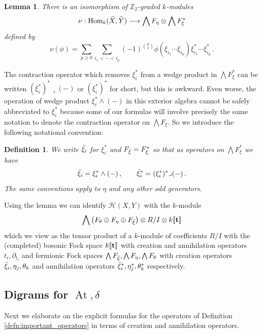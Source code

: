 \documentclass[english,letter paper,12pt,leqno]{article}
\newtheorem{lemma}[theorem]{Lemma}
\theoremstyle{example}
\newtheorem{definition}[theorem]{Definition}
\numberwithin{equation}{section}
\def\HH{\HH}
\def\HH{\mathcal{H}}
\def\Hom{\operatorname{Hom}}
\def\be{\begin{equation}}
\def\ee{\end{equation}}
\def\nZ{\mathds{Z}}
\DeclareMathOperator{\vAt}{At}
\begin{document}
\begin{lemma}\label{lemma:iso_nu} There is an isomorphism of $\nZ_2$-graded $k$-modules
\[
\nu: \Hom_k( \widetilde{X}, \widetilde{Y} ) \lto \bigwedge F_\eta \otimes \bigwedge F_\xi^* 
\]
defined by
\[
\nu( \phi ) = \sum_{p \ge 0} \sum_{i_1 < \cdots < i_p} (-1)^{\binom{p}{2}} \phi( \xi_{i_1} \cdots \xi_{i_p} ) \xi_{i_1}^* \cdots \xi_{i_p}^*\,.
\]
\end{lemma}

The contraction operator which removes $\xi^*_i$ from a wedge product in $\bigwedge F_\xi^*$ can be written $(\xi_i^*)^* \lrcorner (-)$ or $(\xi_i^*)^*$ for short, but this is awkward. Even worse, the operation of wedge product $\xi_i^* \wedge (-)$ in this exterior algebra cannot be safely abbreviated to $\xi_i^*$ because some of our formulas will involve precisely the same notation to denote the contraction operator on $\bigwedge F_\xi$. So we introduce the following notational convention:

\begin{definition}\label{defn:bar_convention} We write $\Bar{\xi}_i$ for $\xi_i^*$ and $F_{\Bar{\xi}} = F_\xi^*$ so that as operators on $\bigwedge F_\xi^*$ we have
\[
\Bar{\xi}_i = \xi_i^* \wedge (-)\,, \qquad \Bar{\xi}_i^* = (\xi_i^*)^* \lrcorner (-)\,.
\]
The same conventions apply to $\eta$ and any other odd generators.
\end{definition}

Using the lemma we can identify $\HH(X,Y)$ with the $k$-module
\be\label{eq:presentationHHalt}
\bigwedge \big( F_\theta \oplus F_\eta \oplus F_{\Bar{\xi}} \big) \otimes R/I \otimes k\llbracket \bold{t} \rrbracket
\ee
which we view as the tensor product of a $k$-module of coefficients $R/I$ with the (completed) bosonic Fock space $k\llbracket \bold{t} \rrbracket$ with creation and annihilation operators $t_i, \partial_{t_i}$ and fermionic Fock spaces $\bigwedge F_{\Bar{\xi}}, \bigwedge F_\eta, \bigwedge F_\theta$ with creation operators $\Bar{\xi}_i, \eta_j, \theta_k$ and annihilation operators $\Bar{\xi}_i^*, \eta_j^*, \theta_k^*$ respectively. 

\subsection{Digrams for $\vAt, \delta$}\label{section:fenyman_diagram_1}

Next we elaborate on the explicit formulas for the operators of Definition \ref{defn:important_operators} in terms of creation and annihilation operators.
\end{document}
